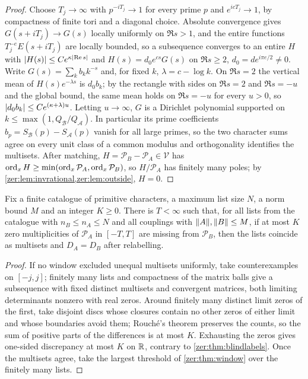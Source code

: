 \begin{proof}
Choose $T_j\to\infty$ with $p^{-iT_j}\to1$ for every prime $p$ and $e^{icT_j}\to1$, by compactness of finite
tori and a diagonal choice. Absolute convergence gives $G(s+iT_j)\to G(s)$ locally uniformly on $\Re s>1$,
and the entire functions $T_j^{-e}E(s+iT_j)$ are locally bounded, so a subsequence converges to an entire
$H$ with $\lvert H(s)\rvert\le Ce^{\kappa\lvert\operatorname{Re} s\rvert}$ and $H(s)=d_0e^{cs}G(s)$ on $\Re s\ge2$, $d_0=de^{i\pi e/2}\ne0$.
Write $G(s)=\sum_kb_kk^{-s}$ and, for fixed $k$, $\lambda=c-\log k$. On $\Re s=2$ the vertical mean of
$H(s)e^{-\lambda s}$ is $d_0b_k$; by the rectangle with sides on $\Re s=2$ and $\Re s=-u$ and the global
bound, the same mean holds on $\Re s=-u$ for every $u>0$, so $\lvert d_0b_k\rvert\le Ce^{(\kappa+\lambda)u}$. Letting
$u\to\infty$, $G$ is a Dirichlet polynomial supported on $k\le\max(1,Q_{\mathcal B}/Q_{\mathcal A})$. In
particular its prime coefficients $b_p=S_{\mathcal B}(p)-S_{\mathcal A}(p)$ vanish for all large primes,
so the two character sums agree on every unit class of a common modulus and orthogonality identifies the
multisets. After matching, $H=\mathcal P_B-\mathcal P_A\in\mathcal V$ has $\operatorname{ord}_xH\ge\min(\operatorname{ord}_x\mathcal P_A,\operatorname{ord}_x\mathcal P_B)$,
so $H/\mathcal P_A$ has finitely many poles; by \cref{zer:lem:invrational,zer:lem:outside}, $H=0$.
\end{proof}

\begin{corollary}\label{zer:cor:catalogue}
Fix a finite catalogue of primitive characters, a maximum list size $N$, a norm bound $M$ and an integer
$K\ge0$. There is $T<\infty$ such that, for all lists from the catalogue with $n_B\le n_A\le N$ and all
couplings with $\lVert A\rVert,\lVert B\rVert\le M$, if at most $K$ zero multiplicities of $\mathcal P_A$ in $[-T,T]$ are
missing from $\mathcal P_B$, then the lists coincide as multisets and $D_A=D_B$ after relabelling.
\end{corollary}
\begin{proof}
If no window excluded unequal multisets uniformly, take counterexamples on $[-j,j]$; finitely many lists
and compactness of the matrix balls give a subsequence with fixed distinct multisets and convergent
matrices, both limiting determinants nonzero with real zeros. Around finitely many distinct limit zeros
of the first, take disjoint discs whose closures contain no other zeros of either limit and whose
boundaries avoid them; Rouch\'e's theorem preserves the counts, so the sum of positive parts of the
differences is at most $K$. Exhausting the zeros gives one-sided discrepancy at most $K$ on $\mathbb{R}$,
contrary to \cref{zer:thm:blindlabels}. Once the multisets agree, take the largest threshold of
\cref{zer:thm:window} over the finitely many lists.
\end{proof}

